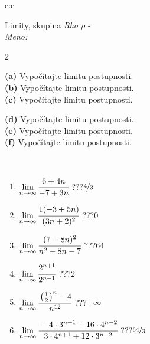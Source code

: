 \documentclass[10pt]{report}
\begin{document}
\newpage
\thispagestyle{empty}
\begin{tabular}{c:c}
\begin{minipage}[c][104.5mm][t]{0.5\linewidth}
\begin{center}
\vspace{5mm}
{\huge Limity, skupina \textit{Rho $\rho$} -}\\[5mm]
\textit{Meno:}\phantom{xxxxxxxxxxxxxxxxxxxxxxxxxxxxxxxxxxxxxxxxxxxxxxxxxxxxxxxxxxxxxxxxx}\\[5mm]
\begin{minipage}{0.95\linewidth}
\begin{center}
{\small \begin{multicols}{2} \raggedright
\textbf{(a)} Vypočítajte limitu postupnosti. \\[1mm]
\textbf{(b)} Vypočítajte limitu postupnosti. \\[1mm]
\textbf{(c)} Vypočítajte limitu postupnosti. \par \columnbreak
\textbf{(d)} Vypočítajte limitu postupnosti. \\[1mm]
\textbf{(e)} Vypočítajte limitu postupnosti. \\[1mm]
\textbf{(f)} Vypočítajte limitu postupnosti.
\end{multicols}
}
\end{center}
\end{minipage}
\\[1mm]
\begin{minipage}{0.79\linewidth}
\begin{center}
\begin{varwidth}{\linewidth}
\setlength{\itemsep}{0pt}
\begin{enumerate}
\footnotesizerr
\item $\lim\limits_{n\to\infty}\cfrac{6+4n}{-7+3n}$\quad \dotfill\; ???\;\dotfill \quad $\nicefrac{4}{3}$
\item $\lim\limits_{n\to\infty}\cfrac{1(-3+5n)}{(3n+2)^2}$\quad \dotfill\; ???\;\dotfill \quad $0$
\item $\lim\limits_{n\to\infty}\cfrac{(7-8n)^2}{n^2-8n-7}$\quad \dotfill\; ???\;\dotfill \quad $64$
\item $\lim\limits_{n\to\infty}\cfrac{2^{n+1}}{2^{n-1}}$\quad \dotfill\; ???\;\dotfill \quad $2$
\item $\lim\limits_{n\to\infty}\cfrac{\left(\frac{1}{2}\right)^n -4}{n^{12}}$\quad \dotfill\; ???\;\dotfill \quad $-\infty$
\item $\lim\limits_{n\to\infty}\cfrac{-4\cdot 3^{n+1}+16\cdot 4^{n-2}}{3\cdot 4^{n+1}+12\cdot 3^{n+2}}$\quad \dotfill\; ???\;\dotfill \quad $\nicefrac{64}{3}$

\end{enumerate}
\end{varwidth}
\end{center}
\end{minipage}
\end{center}
\end{minipage}
\end{tabular}
\end{document}
